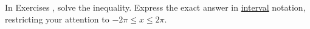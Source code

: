 {\noindent In Exercises}
{, solve the inequality.  Express the exact answer in \underline{interval} notation, restricting your attention to $-2\pi \leq x \leq 2\pi$.}
